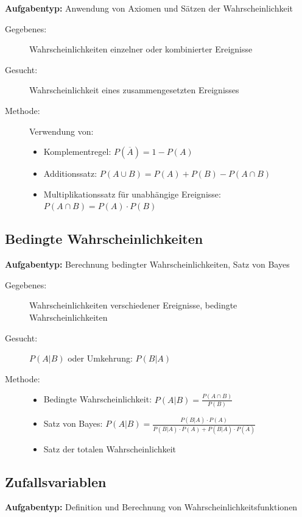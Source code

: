 \documentclass[12pt, a4paper, titlepage, ngerman]{scrartcl}
\begin{document}
\textbf{Aufgabentyp:} Anwendung von Axiomen und Sätzen der Wahrscheinlichkeit

\begin{description}
  \item[Gegebenes:] Wahrscheinlichkeiten einzelner oder kombinierter Ereignisse
  \item[Gesucht:] Wahrscheinlichkeit eines zusammengesetzten Ereignisses
  \item[Methode:] Verwendung von:
    \begin{itemize}
      \item Komplementregel: $P(\overline{A}) = 1 - P(A)$
      \item Additionssatz: $P(A \cup B) = P(A) + P(B) - P(A \cap B)$
      \item Multiplikationssatz für unabhängige Ereignisse: $P(A \cap B) = P(A) \cdot P(B)$
    \end{itemize}
\end{description}

\subsection{Bedingte Wahrscheinlichkeiten}

\textbf{Aufgabentyp:} Berechnung bedingter Wahrscheinlichkeiten, Satz von Bayes

\begin{description}
  \item[Gegebenes:] Wahrscheinlichkeiten verschiedener Ereignisse, bedingte Wahrscheinlichkeiten
  \item[Gesucht:] $P(A|B)$ oder Umkehrung: $P(B|A)$
  \item[Methode:] 
    \begin{itemize}
      \item Bedingte Wahrscheinlichkeit: $P(A|B) = \frac{P(A \cap B)}{P(B)}$
      \item Satz von Bayes: $P(A|B) = \frac{P(B|A) \cdot P(A)}{P(B|A) \cdot P(A) + P(B|\overline{A}) \cdot P(\overline{A})}$
      \item Satz der totalen Wahrscheinlichkeit
    \end{itemize}
\end{description}

\subsection{Zufallsvariablen}

\textbf{Aufgabentyp:} Definition und Berechnung von Wahrscheinlichkeitsfunktionen
\end{document}
